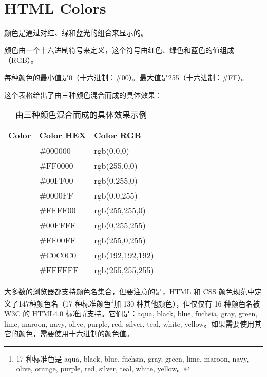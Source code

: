 \part{HTML Colors}

颜色是通过对红、绿和蓝光的组合来显示的。

颜色由一个十六进制符号来定义，这个符号由红色、绿色和蓝色的值组成（RGB）。

每种颜色的最小值是0（十六进制：\#00）。最大值是255（十六进制：\#FF）。

这个表格给出了由三种颜色混合而成的具体效果：

\begin{table}[!h]
\centering
\caption{由三种颜色混合而成的具体效果示例}
\begin{tabular}{|p{100pt}|p{100pt}|p{100pt}|}
\hline
Color				&Color HEX		&Color RGB		\\
\hline
\cellcolor{Black}	&\#000000		&rgb(0,0,0)		\\
\hline
\cellcolor{Red}	&\#FF0000		&rgb(255,0,0)	\\
\hline
\cellcolor{Green}	&\#00FF00		&rgb(0,255,0)	\\
\hline
\cellcolor{Blue}	&\#0000FF		&rgb(0,0,255)	\\
\hline
\cellcolor{Yellow}	&\#FFFF00		&rgb(255,255,0)	\\
\hline
\cellcolor{Cyan}	&\#00FFFF		&rgb(0,255,255)	\\
\hline
\cellcolor{Magenta}	&\#FF00FF		&rgb(255,0,255)	\\
\hline
\cellcolor{Silver}	&\#C0C0C0		&rgb(192,192,192)\\
\hline
\cellcolor{White}	&\#FFFFFF		&rgb(255,255,255)\\
\hline
\end{tabular}
\end{table}

大多数的浏览器都支持颜色名集合，但要注意的是，HTML 和 CSS 颜色规范中定义了147种颜色名（17 种标准颜色\footnote{17 种标准色是 aqua, black, blue, fuchsia, gray, green, lime, maroon, navy, olive, orange, purple, red, silver, teal, white, yellow。}加 130 种其他颜色），但仅仅有 16 种颜色名被 W3C 的 HTML4.0 标准所支持。它们是：aqua, black, blue, fuchsia, gray, green, lime, maroon, navy, olive, purple, red, silver, teal, white, yellow。如果需要使用其它的颜色，需要使用十六进制的颜色值。

